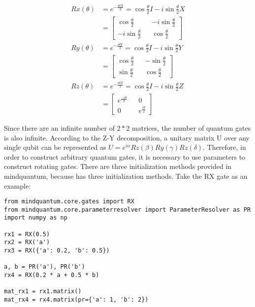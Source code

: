 \begin{align*}
    Rx(\theta) & =
    e^{-\frac{i\theta X}{2}}=
    \cos{\frac{\theta}{2}}I-i\sin{\frac{\theta}{2}}X                                  \\
               & =\begin{bmatrix}
                      \cos{\frac{\theta}{2}}   &  & -i\sin{\frac{\theta}{2}} \\
                      -i\sin{\frac{\theta}{2}} &  & \cos{\frac{\theta}{2}}
                  \end{bmatrix}    \\
    Ry(\theta) & =
    e^{-\frac{i\theta Y}{2}}=
    \cos{\frac{\theta}{2}}I-i\sin{\frac{\theta}{2}}Y                                  \\
               & =    \begin{bmatrix}
                          \cos{\frac{\theta}{2}} &  & -\sin{\frac{\theta}{2}} \\
                          \sin{\frac{\theta}{2}} &  & \cos{\frac{\theta}{2}}
                      \end{bmatrix} \\
    Rz(\theta) & =
    e^{-\frac{i\theta Z}{2}}=
    \cos{\frac{\theta}{2}}I-i\sin{\frac{\theta}{2}}Z                                  \\
               & =    \begin{bmatrix}
                          e^{\frac{-i\theta}{2}} &  & 0                     \\
                          0                      &  & e^{\frac{i\theta}{2}}
                      \end{bmatrix}
\end{align*}


Since there are an infinite number of $2*2$ matrices, the number of quantum gates is also infinite. According to the Z-Y decomposition, a unitary matrix U over any single qubit can be represented as $U=e^{i\alpha}Rz(\beta)Ry(\gamma)Rz(\delta)$. Therefore, in order to construct arbitrary quantum gates, it is necessary to use parameters to construct rotating gates. There are three initialization methods provided in mindquantum, because \ParameterResolver has three initialization methods. Take the RX gate as an example:

\begin{lstlisting}
from mindquantum.core.gates import RX
from mindquantum.core.parameterresolver import ParameterResolver as PR
import numpy as np

rx1 = RX(0.5)
rx2 = RX('a')
rx3 = RX({'a': 0.2, 'b': 0.5})

a, b = PR('a'), PR('b')
rx4 = RX(0.2 * a + 0.5 * b)

mat_rx1 = rx1.matrix()
mat_rx4 = rx4.matrix(pr={'a': 1, 'b': 2})
\end{lstlisting}

